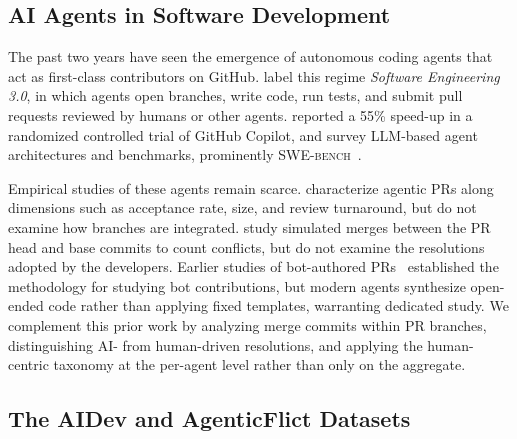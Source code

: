 \documentclass[sigconf,anonymous]{acmart}
\begin{document}
\subsection{AI Agents in Software Development}
\label{sec:bg-agents}

The past two years have seen the emergence of autonomous coding agents that act as first-class contributors on GitHub. \citet{liaidev2025se3} label this regime \emph{Software Engineering 3.0}, in which agents open branches, write code, run tests, and submit pull requests reviewed by humans or other agents. \citet{peng2023copilot} reported a 55\% speed-up in a randomized controlled trial of GitHub Copilot, and \citet{wang2024llmagents} survey LLM-based agent architectures and benchmarks, prominently \textsc{SWE-bench}~\cite{jimenez2024swebench}.


Empirical studies of these agents remain scarce. \citet{liaidev2025se3,liaidev2026} characterize agentic PRs along dimensions such as acceptance rate, size, and review turnaround, but do not examine how branches are integrated. \citet{agenticflict2025} study simulated merges between the PR head and base commits to count conflicts, but do not examine the resolutions adopted by the developers. Earlier studies of bot-authored PRs~\cite{alfadel2021dependabot} established the methodology for studying bot contributions, but modern agents synthesize open-ended code rather than applying fixed templates, warranting dedicated study. We complement this prior work by analyzing merge commits within PR branches, distinguishing AI- from human-driven resolutions, and applying the human-centric taxonomy at the per-agent level rather than only on the aggregate.

\subsection{The AIDev and AgenticFlict Datasets}
\label{sec:bg-agenticflict}
\end{document}

